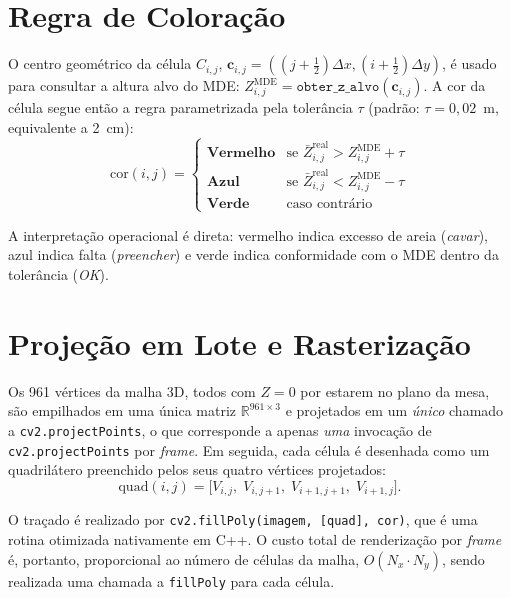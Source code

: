 \section{Regra de Coloração}
\label{sec:cor}

O centro geométrico da célula $C_{i,j}$,
$\mathbf{c}_{i,j} = ((j + \tfrac{1}{2}) \Delta x, (i + \tfrac{1}{2}) \Delta y)$,
é usado para consultar a altura alvo do MDE:
$Z^{\text{MDE}}_{i,j} = \texttt{obter\_z\_alvo}(\mathbf{c}_{i,j})$.
A cor da célula segue então a regra parametrizada pela tolerância
$\tau$ (padrão: $\tau = 0{,}02$~m, equivalente a 2~cm):
\begin{equation}
\text{cor}(i, j) = \begin{cases}
\textbf{Vermelho} & \text{se } \bar{Z}^{\text{real}}_{i,j} > Z^{\text{MDE}}_{i,j} + \tau \\
\textbf{Azul}     & \text{se } \bar{Z}^{\text{real}}_{i,j} < Z^{\text{MDE}}_{i,j} - \tau \\
\textbf{Verde}    & \text{caso contrário}
\end{cases}
\end{equation}

\noindent A interpretação operacional é direta: vermelho
indica excesso de areia (\emph{cavar}), azul indica falta
(\emph{preencher}) e verde indica conformidade com o MDE
dentro da tolerância (\emph{OK}).

\section{Projeção em Lote e Rasterização}
\label{sec:rasterizacao}

Os 961 vértices da malha 3D, todos com $Z = 0$ por estarem no plano da
mesa, são empilhados em uma única matriz $\mathbb{R}^{961 \times 3}$ e
projetados em um \emph{único} chamado a \texttt{cv2.projectPoints}, o
que corresponde a apenas \emph{uma} invocação de
\texttt{cv2.projectPoints} por \textit{frame}. Em seguida, cada célula
é desenhada como um quadrilátero preenchido pelos seus quatro vértices
projetados:
\begin{equation}
\text{quad}(i,j) = \big[ V_{i,j},\; V_{i,j+1},\; V_{i+1,j+1},\; V_{i+1,j} \big].
\end{equation}

\noindent O traçado é realizado por
\texttt{cv2.fillPoly(imagem, [quad], cor)}, que é uma rotina
otimizada nativamente em C++. O custo total de renderização por
\emph{frame} é, portanto, proporcional ao número de células da
malha, $O(N_x \cdot N_y)$, sendo realizada uma chamada a
\texttt{fillPoly} para cada célula.

